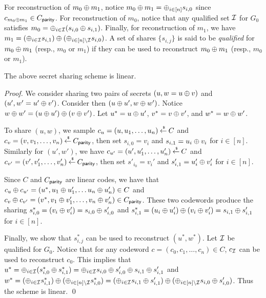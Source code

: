 For reconstruction of $m_0\oplus m_1$, notice $m_0\oplus m_1 = \oplus_{i \in [n]} s_{i,0}$ since $c_{m_0\oplus m_1} \in C_{\mathsf{parity}}$.
For reconstruction of $m_0$, notice that any qualified set ${\mathcal I}$ for $G_0$ satisfies $m_0 = \oplus_{i \in {\mathcal I}} (s_{i,0} \oplus s_{i,1})$.
Finally, for reconstruction of $m_1$, we have $m_1 = (\oplus_{i \in {\mathcal I}} s_{i,1})\oplus(\oplus_{i \in [n]\setminus {\mathcal I}} s_{i,0})$.
A set of shares $\{s_{i,j}\}$ is said to be {\em qualified} for $m_0\oplus m_1$ (resp., $m_0$ or $m_1$) if they can be used to reconstruct $m_0\oplus m_1$ (resp., $m_0$ or $m_1$).
\begin{myclaim}
	The above secret sharing scheme is linear.
\end{myclaim}
\begin{proof}
	We consider sharing two pairs of secrets $(u, w = u \oplus v)$ and $(u', w' = u' \oplus v')$.
	Consider then $(u\oplus u', w\oplus w')$.
	Notice $w\oplus w' = (u \oplus u') \oplus (v \oplus v')$.
	Let $u^* = u\oplus u'$, $v^* = v\oplus v'$, and $w^* = w\oplus w'$.
	
	To share $(u,w)$, we sample $c_u = (u, u_1,\dotsc, u_n) \mathbin{\stackrel{\mbox{\,\tiny \$}}{\gets}} C$ and $c_v = (v,v_1,\dotsc, v_n) \mathbin{\stackrel{\mbox{\,\tiny \$}}{\gets}} C_\mathsf{parity}$, then set $s_{i,0} = v_i$ and $s_{i,1} = u_i\oplus v_i$ for $i \in [n]$.
	Similarly for $(u',w')$, we have $c_{u'} = (u',u_1',\dotsc,u_n') \mathbin{\stackrel{\mbox{\,\tiny \$}}{\gets}} C$ and $c_{v'} = (v',v_1',\dotsc,v_n') \mathbin{\stackrel{\mbox{\,\tiny \$}}{\gets}} C_\mathsf{parity}$, then set $s'_{i_0} = v_i'$ and $s'_{i,1} = u_i' \oplus v_i'$ for $i \in [n]$.
	
	Since $C$ and $C_\mathsf{parity}$ are linear codes, we have that $c_u \oplus c_{u'} = (u^*, u_1\oplus u_1',\dotsc u_n \oplus u_n') \in C$ and $c_v \oplus c_{v'} = (v^*, v_1 \oplus v_1',\dotsc, v_n \oplus v_n') \in C_\mathsf{parity}$.
	These two codewords produce the sharing $s^*_{i,0} = (v_i\oplus v_i') = s_{i,0}\oplus s_{i,0}'$ and $s^*_{i,1} = (u_i\oplus u_i') \oplus (v_i \oplus v_i') = s_{i,1}\oplus s_{i,1}'$ for $i \in [n]$.
	
	Finally, we show that $s^*_{i,j}$ can be used to reconstruct $(u^*, w^*)$.
	Let ${\mathcal I}$ be qualified for $G_0$.
	Notice that for any codeword $c = (c_0, c_1,\dotsc,c_n) \in C$, $c_{\mathcal I}$ can be used to reconstruct $c_0$.
	This implies that $u^* = \oplus_{i \in {\mathcal I}} (s_{i,0}^* \oplus s_{i,1}^*) = \oplus_{i \in {\mathcal I}} s_{i,0}\oplus s_{i,0}' \oplus s_{i,1}\oplus s_{i,1}'$ and $w^* = (\oplus_{i \in {\mathcal I}} s^*_{i,1})\oplus (\oplus_{i \in [n]\setminus {\mathcal I}}s_{i,0}^*) = (\oplus_{i \in {\mathcal I}} s_{i,1}\oplus s'_{i,1}) \oplus (\oplus_{i \in [n]\setminus {\mathcal I}}s_{i,0}\oplus s_{i,0}')$.
	Thus the scheme is linear. \qed
\end{proof}

